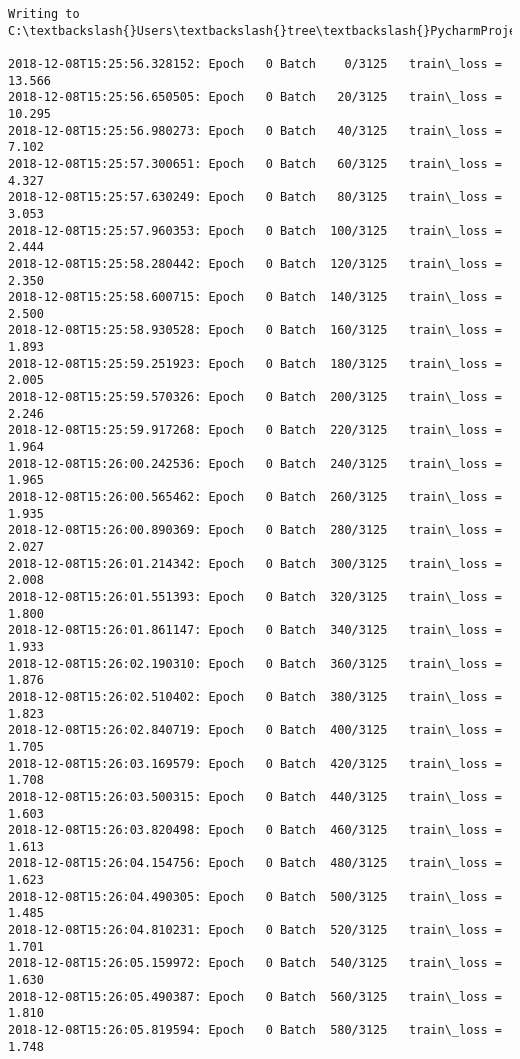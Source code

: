 \documentclass[11pt]{article}
\begin{document}
    \begin{Verbatim}[commandchars=\\\{\}]
Writing to C:\textbackslash{}Users\textbackslash{}tree\textbackslash{}PycharmProjects\textbackslash{}recommendation\textbackslash{}SecondWeek1202\textbackslash{}runs\textbackslash{}1544253954

2018-12-08T15:25:56.328152: Epoch   0 Batch    0/3125   train\_loss = 13.566
2018-12-08T15:25:56.650505: Epoch   0 Batch   20/3125   train\_loss = 10.295
2018-12-08T15:25:56.980273: Epoch   0 Batch   40/3125   train\_loss = 7.102
2018-12-08T15:25:57.300651: Epoch   0 Batch   60/3125   train\_loss = 4.327
2018-12-08T15:25:57.630249: Epoch   0 Batch   80/3125   train\_loss = 3.053
2018-12-08T15:25:57.960353: Epoch   0 Batch  100/3125   train\_loss = 2.444
2018-12-08T15:25:58.280442: Epoch   0 Batch  120/3125   train\_loss = 2.350
2018-12-08T15:25:58.600715: Epoch   0 Batch  140/3125   train\_loss = 2.500
2018-12-08T15:25:58.930528: Epoch   0 Batch  160/3125   train\_loss = 1.893
2018-12-08T15:25:59.251923: Epoch   0 Batch  180/3125   train\_loss = 2.005
2018-12-08T15:25:59.570326: Epoch   0 Batch  200/3125   train\_loss = 2.246
2018-12-08T15:25:59.917268: Epoch   0 Batch  220/3125   train\_loss = 1.964
2018-12-08T15:26:00.242536: Epoch   0 Batch  240/3125   train\_loss = 1.965
2018-12-08T15:26:00.565462: Epoch   0 Batch  260/3125   train\_loss = 1.935
2018-12-08T15:26:00.890369: Epoch   0 Batch  280/3125   train\_loss = 2.027
2018-12-08T15:26:01.214342: Epoch   0 Batch  300/3125   train\_loss = 2.008
2018-12-08T15:26:01.551393: Epoch   0 Batch  320/3125   train\_loss = 1.800
2018-12-08T15:26:01.861147: Epoch   0 Batch  340/3125   train\_loss = 1.933
2018-12-08T15:26:02.190310: Epoch   0 Batch  360/3125   train\_loss = 1.876
2018-12-08T15:26:02.510402: Epoch   0 Batch  380/3125   train\_loss = 1.823
2018-12-08T15:26:02.840719: Epoch   0 Batch  400/3125   train\_loss = 1.705
2018-12-08T15:26:03.169579: Epoch   0 Batch  420/3125   train\_loss = 1.708
2018-12-08T15:26:03.500315: Epoch   0 Batch  440/3125   train\_loss = 1.603
2018-12-08T15:26:03.820498: Epoch   0 Batch  460/3125   train\_loss = 1.613
2018-12-08T15:26:04.154756: Epoch   0 Batch  480/3125   train\_loss = 1.623
2018-12-08T15:26:04.490305: Epoch   0 Batch  500/3125   train\_loss = 1.485
2018-12-08T15:26:04.810231: Epoch   0 Batch  520/3125   train\_loss = 1.701
2018-12-08T15:26:05.159972: Epoch   0 Batch  540/3125   train\_loss = 1.630
2018-12-08T15:26:05.490387: Epoch   0 Batch  560/3125   train\_loss = 1.810
2018-12-08T15:26:05.819594: Epoch   0 Batch  580/3125   train\_loss = 1.748

\end{Verbatim}
\end{document}
